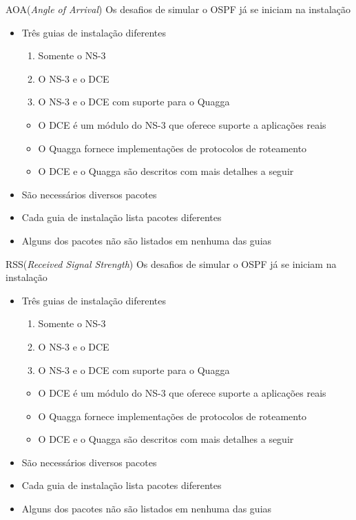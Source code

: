 \documentclass{beamer}
\newlength{\wideitemsep}
\let\olditem\item
\renewcommand{\item}{\setlength{\itemsep}{\wideitemsep}\olditem}
\begin{document}
\begin{frame}{AOA(\textit{Angle of Arrival})}
Os desafios de simular o OSPF já se iniciam na instalação
\begin{itemize}
 \item Três guias de instalação diferentes %
  \begin{enumerate}
   \olditem Somente o NS-3 %
   \olditem O NS-3 e o DCE %
   \olditem O NS-3 e o DCE com suporte para o Quagga %
  \end{enumerate}
  \begin{itemize}
   \olditem O DCE é um módulo do NS-3 que oferece suporte a aplicações reais %
   \olditem O Quagga fornece implementações de protocolos de roteamento %
   \olditem O DCE e o Quagga são descritos com mais detalhes a seguir %
  \end{itemize}
 \item São necessários diversos pacotes %
 \item Cada guia de instalação lista pacotes diferentes %
 \item Alguns dos pacotes não são listados em nenhuma das guias %
\end{itemize}
\end{frame}

\begin{frame}{RSS(\textit{Received Signal Strength})}
Os desafios de simular o OSPF já se iniciam na instalação
\begin{itemize}
 \item Três guias de instalação diferentes %
  \begin{enumerate}
   \olditem Somente o NS-3 %
   \olditem O NS-3 e o DCE %
   \olditem O NS-3 e o DCE com suporte para o Quagga %
  \end{enumerate}
  \begin{itemize}
   \olditem O DCE é um módulo do NS-3 que oferece suporte a aplicações reais %
   \olditem O Quagga fornece implementações de protocolos de roteamento %
   \olditem O DCE e o Quagga são descritos com mais detalhes a seguir %
  \end{itemize}
 \item São necessários diversos pacotes %
 \item Cada guia de instalação lista pacotes diferentes %
 \item Alguns dos pacotes não são listados em nenhuma das guias %
\end{itemize}
\end{frame}
\end{document}
